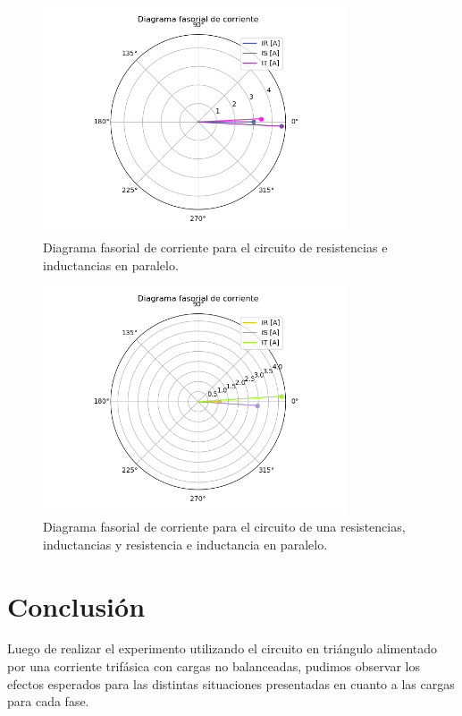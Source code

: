 \documentclass[a4paper]{article}
\begin{document}
\begin{figure}[H]
	\centering
	\includegraphics[width=0.8\textwidth]{Corriente-PARALELO}
\caption{Diagrama fasorial de corriente para el circuito de resistencias e inductancias en paralelo.}
	\label{fig:corriente-par}
\end{figure}

\begin{figure}[H]
	\centering
	\includegraphics[width=0.8\textwidth]{Corriente-RPARALELOL}
\caption{Diagrama fasorial de corriente para el circuito de una resistencias, inductancias y resistencia e inductancia en paralelo.}
	\label{fig:corriente-rlpar}
\end{figure}


\section*{Conclusión}

Luego de realizar el experimento utilizando el circuito en triángulo alimentado por una corriente 
trifásica con cargas no balanceadas, pudimos observar los efectos esperados para las distintas situaciones presentadas en cuanto a las cargas para cada fase.
\end{document}
